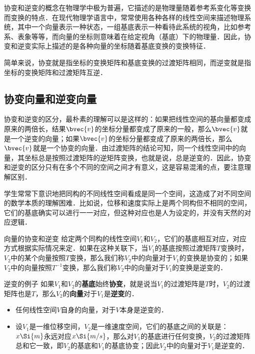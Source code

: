 

协变和逆变的概念在物理学中极为普遍，它描述的是物理量随着参考系变化等变换而变换的特点．在现代物理学语言中，常常使用各种各样的线性空间来描述物理系统，其中一个向量表示一种状态，一组基底表示一种看待此系统的视角，比如参考系、表象等等，而向量的坐标则意味着在给定视角（基底）下的物理量．因此，协变和逆变实际上描述的是各种向量的坐标随着基底变换的变换特征．

简单来说，协变就是指坐标的变换矩阵和基底变换的过渡矩阵相同，而逆变就是指坐标的变换矩阵和过渡矩阵互逆．

\subsection{协变向量和逆变向量}

协变和逆变的区分，最朴素的理解可以是这样的：如果把线性空间的基向量都变成原来的两倍长，结果$\bvec{v}$的坐标分量都变成了原来的一般，那么$\bvec{v}$就是一个逆变的向量；如果$\bvec{v}$的坐标分量都变成了原来的两倍长，那么$\bvec{v}$就是一个协变的向量．由过渡矩阵的结论可知，同一个线性空间中的向量，其坐标总是按照过渡矩阵的逆矩阵变换，也就是说，总是逆变的．因此，协变和逆变的区分只有在多个不同的空间之间才有意义，这是容易混淆的点，要注意理解区别．

学生常常下意识地把同构的不同线性空间看成是同一个空间，这造成了对不同空间的数学本质的理解困难．比如说，位移和速度实际上是两个同构但不相同的空间，它们的基底确实可以进行一一对应，但这种对应也是人为设定的，并没有天然的对应逻辑．

\begin{definition}{向量的协变和逆变}
给定两个同构的线性空间$V_1$和$V_2$，它们的基底相互对应，对应方式根据实际情况来定．如果在这种关联下，当$V_1$的基底按照过渡矩阵$T$变换时，$V_2$中的某个向量按照$T$变换，那么我们称$V_2$中的向量对于$V_1$的变换是协变的；如果$V_2$中的向量按照$T^{-1}$变换，那么我们称$V_2$中的向量对于$V_1$的变换是逆变的．
\end{definition}

\begin{example}{逆变的例子}
如果$V_1$和$V_2$的\textbf{基底}始终\textbf{协变}，就是说当$V_1$的过渡矩阵是$T$时，$V_2$的过渡矩阵也是$T$，那么$V_2$的\textbf{向量}对于$V_1$是\textbf{逆变}的．
\begin{itemize}
\item 任何线性空间$V$自身的向量，对于$V$本身是逆变的．
\item 设$V_1$是一维位移空间，$V_2$是一维速度空间，它们的基底之间的关联是：$x \Si{m}$永远对应$x \Si{m/s}$，那么对$V_1$的基底进行任何变换，$V_2$的过渡矩阵总和它一致，即$V_2$的基底和$V_1$的基底协变；因此$V_2$中的向量对于$V_1$是逆变的．
\end{itemize}
\end{example}

